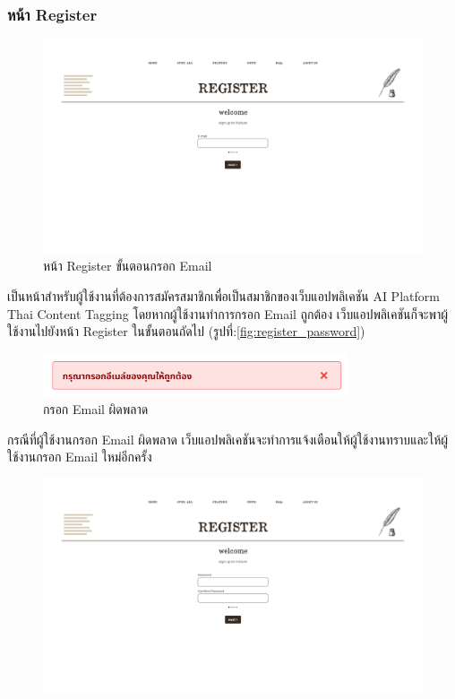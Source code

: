 \documentclass[12pt,oneside,openright,a4paper]{cpe-thai-project}
\begin{document}
\begin{itemize}
\subsubsection{หน้า Register}
\begin{figure}[!ht]\centering
  \includegraphics[width=16cm]{./img/project_ui/4.png} 
  \caption{หน้า Register ขั้นตอนกรอก Email}\label{fig:register} 
\end{figure}
\hspace*{1cm}เป็นหน้าสำหรับผู้ใช้งานที่ต้องการสมัครสมาชิกเพื่อเป็นสมาชิกของเว็บแอปพลิเคชัน AI Platform Thai Content Tagging 
โดยหากผู้ใช้งานทำการกรอก Email ถูกต้อง เว็บแอปพลิเคชันก็จะพาผู้ใช้งานไปยังหน้า Register ในขั้นตอนถัดไป (รูปที่:\ref{fig:register_password})
\begin{figure}[!ht]\centering
  \includegraphics[width=9cm]{./img/project_ui/wrong_email.png} 
  \caption{กรอก Email ผิดพลาด}\label{fig:wrong_email} 
\end{figure}
\newline\hspace*{1cm}กรณีที่ผู้ใช้งานกรอก Email ผิดพลาด เว็บแอปพลิเคชันจะทำการแจ้งเตือนให้ผู้ใช้งานทราบและให้ผู้ใช้งานกรอก Email ใหม่อีกครั้ง \newpage
\begin{figure}[!ht]\centering
  \includegraphics[width=14cm]{./img/project_ui/5.png} 

\end{figure}
\end{itemize}
\end{document}
